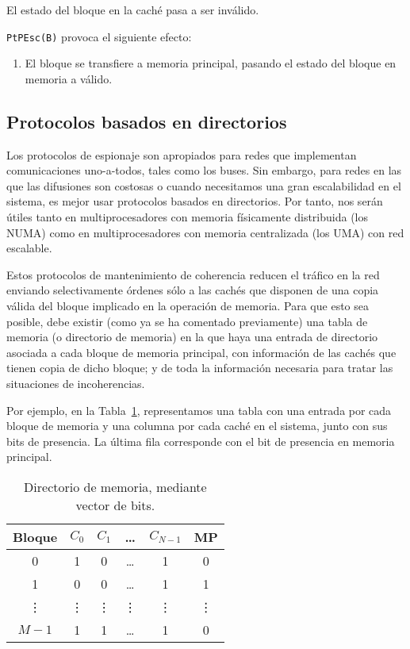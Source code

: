 \begin{description}
        El estado del bloque en la caché pasa a ser inválido.

        \verb|PtPEsc(B)| provoca el siguiente efecto:
        \begin{enumerate}
            \item El bloque se transfiere a memoria principal, pasando el estado del bloque en memoria a válido.
        \end{enumerate}
\end{description}

\subsection{Protocolos basados en directorios} \label{sec:protocolos_directorios}
Los protocolos de espionaje son apropiados para redes que implementan comunicaciones uno-a-todos, tales como los buses. Sin embargo, para redes en las que las difusiones son costosas o cuando necesitamos una gran escalabilidad en el sistema, es mejor usar protocolos basados en directorios. Por tanto, nos serán útiles tanto en multiprocesadores con memoria físicamente distribuida (los NUMA) como en multiprocesadores con memoria centralizada (los UMA) con red escalable.

Estos protocolos de mantenimiento de coherencia reducen el tráfico en la red enviando selectivamente órdenes sólo a las cachés que disponen de una copia válida del bloque implicado en la operación de memoria. Para que esto sea posible, debe existir (como ya se ha comentado previamente) una tabla de memoria (o directorio de memoria) en la que haya una entrada de directorio asociada a cada bloque de memoria principal, con información de las cachés que tienen copia de dicho bloque; y de toda la información necesaria para tratar las situaciones de incoherencias. 

Por ejemplo, en la Tabla~\ref{tab:directorio_memoria}, representamos una tabla con una entrada por cada bloque de memoria y una columna por cada caché en el sistema, junto con sus bits de presencia. La última fila corresponde con el bit de presencia en memoria principal.\\

\begin{table}[H]
\centering
\begin{tabular}{c c c c c c}
    Bloque & $C_0$ & $C_1$ & \ldots & $C_{N-1}$ & MP \\
    \bottomrule
    0 & 1 & 0 & \ldots & 1 & 0 \\
    1 & 0 & 0 & \ldots & 1 & 1 \\
    \vdots & \vdots & \vdots & \vdots & \vdots & \vdots \\
    $M-1$ & 1 & 1 & \ldots & 1 & 0 \\
\end{tabular}
\caption{Directorio de memoria, mediante vector de bits.}
\label{tab:directorio_memoria}
\end{table}

